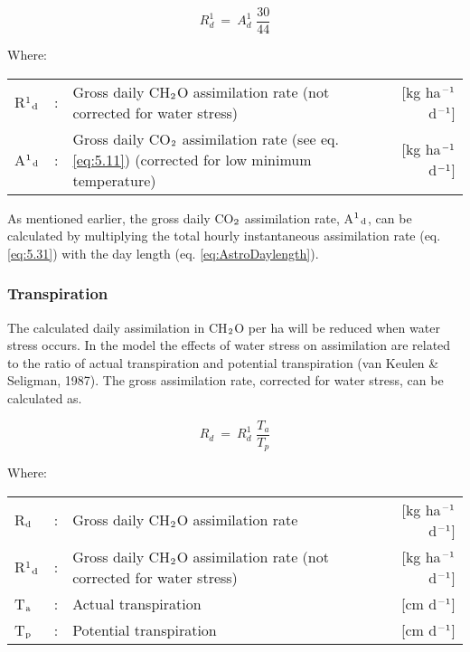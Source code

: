 \begin{equation}
R _{d}^{1} ~=~ A _{d}^{1} \,\,{\frac{30}{44}}
\end{equation}

Where:\\[5pt]
\begin{tabularx}{\textwidth}{llXr}
R$^{{\rm 1}}$$_{{\rm d}}$ &:& Gross daily CH$_{{\rm 2}}$O assimilation rate 
   (not corrected for water stress) &   [kg ha$^{{\rm -1}}$ d$^{{\rm -1}}$]\\
A$^{{\rm 1}}$$_{{\rm d}}$ &:& Gross daily CO$_{{\rm 2}}$ assimilation rate 
   (see eq. \ref{eq:5.11}) (corrected for low minimum temperature)   &    [kg ha$^{{\rm -1}}$ d$^{{\rm -1}}$]\\   
\end{tabularx}
 
As mentioned earlier, the gross daily CO$_{{\rm 2}}$ assimilation rate, A$^{{\rm 1}}$$_{{\rm d}}$, 
can be calculated by multiplying the total hourly instantaneous assimilation rate (eq. \ref{eq:5.31}) 
with the day length (eq. \ref{eq:AstroDaylength}). 

\subsubsection{Transpiration}
The calculated daily assimilation in CH$_{{\rm 2}}$O per ha will be reduced when water stress
occurs. In the model the effects of water stress on assimilation are related to the ratio of
actual transpiration and potential transpiration (van Keulen \& Seligman, 1987).
The gross assimilation rate, corrected for water stress, can be calculated as.

\begin{equation}
\label{eq:5.37}
R _{d} ~=~ R _{d}^{1} \,\,{\frac{T _{a} }{T _{p} }}
\end{equation}

Where:\\[5pt]
\begin{tabularx}{\textwidth}{llXr}
R$_{{\rm d}}$ &:& Gross daily CH$_{{\rm 2}}$O assimilation rate   &     
    [kg ha$^{{\rm -1}}$ d$^{{\rm -1}}$]\\
R$^{{\rm 1}}$$_{{\rm d}}$ &:& Gross daily CH$_{{\rm 2}}$O assimilation rate
   (not corrected for water stress)   &     [kg ha$^{{\rm -1}}$ d$^{{\rm -1}}$]\\
T$_{{\rm a}}$ &:& Actual transpiration   &     [cm d$^{{\rm -1}}$]\\
T$_{{\rm p}}$ &:& Potential transpiration   &     [cm d$^{{\rm -1}}$]\\
\end{tabularx}

